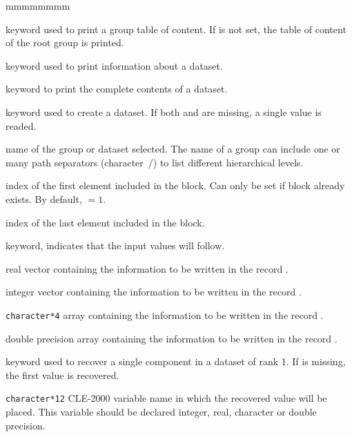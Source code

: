 \begin{ListeDeDescription}{mmmmmmmm}

\item[\moc{DIR}] keyword used to print a group table of content. If  is not set, the table of content of the root group is printed.

\item[\moc{INFO}] keyword used to print information about a dataset.

\item[\moc{IMPR}] keyword to print the complete contents of a dataset.

\item[\moc{CREA}] keyword used to create a dataset. If both  and  are missing, a single value is readed.

\item[\dusa{BLOCK}] name of the group or dataset selected. The name of a group can include one or many path separators (character~$\slash$)
to list different hierarchical levels.

\item[\dusa{ilenc1}] index of the first element included in the block. Can only be set if block
 already exists. By default,  $=1$.

\item[\dusa{ilenc2}] index of the last element included in the block.

\item[\moc{=}] keyword, indicates that the input values will follow.

\item[\dusa{valc}] real vector containing the information to be written in the record .

\item[\dusa{ivalc}] integer vector containing the information to be written in the record .

\item[\dusa{hvalc}] {\tt character*4} array containing the information to be written in the record .

\item[\dusa{dvalc}] double precision array containing the information to be written in the record .

\item[\moc{CREA}] keyword used to recover a single component in a dataset of rank 1. If  is missing, the first value is recovered.

\item[\dusa{value}] {\tt character*12} CLE-2000 variable name in which the recovered value will be placed. This variable should be
declared integer, real, character or double precision.

\end{ListeDeDescription}

